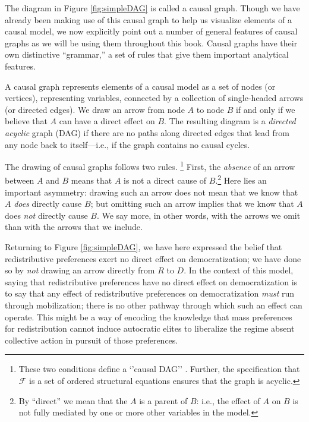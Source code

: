 \documentclass[12pt,]{book}
\let\rmarkdownfootnote\footnote%
\def\footnote{\protect\rmarkdownfootnote}
\begin{document}
The diagram in Figure \ref{fig:simpleDAG} is called a causal graph. Though we have already been making use of this causal graph to help us visualize elements of a causal model, we now explicitly point out a number of general features of causal graphs as we will be using them throughout this book. Causal graphs have their own distinctive ``grammar,'' a set of rules that give them important analytical features.

A causal graph represents elements of a causal model as a set of nodes (or vertices), representing variables, connected by a collection of single-headed arrows (or directed edges). We draw an arrow from node \(A\) to node \(B\) if and only if we believe that \(A\) can have a direct effect on \(B\). The resulting diagram is a \emph{directed acyclic} graph (DAG) if there are no paths along directed edges that lead from any node back to itself---i.e., if the graph contains no causal cycles.

The drawing of causal graphs follows two rules. \footnote{These two conditions define a `'causal DAG'' \citep{hernan2006instruments}. Further, the specification that \(\mathcal{F}\) is a set of ordered structural equations ensures that the graph is acyclic.} First, the \emph{absence} of an arrow between \(A\) and \(B\) means that \(A\) is not a direct cause of \(B\).\footnote{By ``direct'' we mean that the \(A\) is a parent of \(B\): i.e., the effect of \(A\) on \(B\) is not fully mediated by one or more other variables in the model.} Here lies an important asymmetry: drawing such an arrow does not mean that we know that \(A\) \emph{does} directly cause \(B\); but omitting such an arrow implies that we know that \(A\) does \emph{not} directly cause \(B\). We say more, in other words, with the arrows we omit than with the arrows that we include.

Returning to Figure \ref{fig:simpleDAG}, we have here expressed the belief that redistributive preferences exert no direct effect on democratization; we have done so by \emph{not} drawing an arrow directly from \(R\) to \(D\). In the context of this model, saying that redistributive preferences have no direct effect on democratization is to say that any effect of redistributive preferences on democratization \emph{must} run through mobilization; there is no other pathway through which such an effect can operate. This might be a way of encoding the knowledge that mass preferences for redistribution cannot induce autocratic elites to liberalize the regime absent collective action in pursuit of those preferences.
\end{document}
